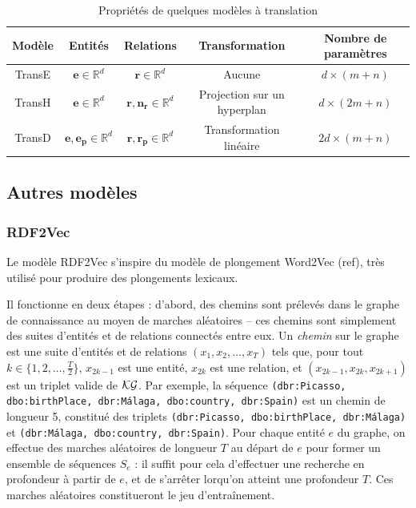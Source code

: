 \begin{table}[ht]
\caption{Propriétés de quelques modèles à translation}
\centering
\begin{tabular}{|c|c|c|c|c|}
\hline\rowcolor[gray]{0.8}\color{black}
Modèle & Entités & Relations & Transformation & Nombre de paramètres\\\hline
TransE & $\mathbf{e} \in \mathbb{R}^d$ & $\mathbf{r} \in \mathbb{R}^d$ & Aucune & $d \times (m + n)$ \\
TransH & $\mathbf{e} \in \mathbb{R}^d$ & $\mathbf{r, n_r} \in \mathbb{R}^d$ & Projection sur un hyperplan & $d \times (2m + n)$ \\
TransD & $\mathbf{e, e_p} \in \mathbb{R}^d$ & $\mathbf{r, r_p} \in \mathbb{R}^d$  & Transformation linéaire & $2d \times (m + n)$ \\\hline
\end{tabular}
\label{tab:transx}
\end{table}

\subsection{Autres modèles}
\label{subsec:kge-models-misc}

\subsubsection{RDF2Vec}

Le modèle RDF2Vec s'inspire du modèle de plongement Word2Vec (ref), très utilisé pour produire des plongements lexicaux.

Il fonctionne en deux étapes : d'abord, des chemins sont prélevés dans le graphe de connaissance au moyen de marches aléatoires – ces chemins sont simplement des suites d'entités et de relations connectés entre eux. %
Un \textit{chemin} sur le graphe est une suite d'entités et de relations $(x_1, x_2, \ldots, x_T)$ tels que, pour tout $k \in \{1, 2, \ldots, \frac{T}{2}\}$, $x_{2k-1}$ est une entité, $x_{2k}$ est une relation, et $(x_{2k-1}, x_{2k}, x_{2k+1})$ est un triplet valide de $\mathcal{KG}$. Par exemple, la séquence \texttt{(dbr:Picasso, dbo:birthPlace, dbr:Málaga, dbo:country, dbr:Spain)} est un chemin de longueur 5, constitué des triplets \texttt{(dbr:Picasso, dbo:birthPlace, dbr:Málaga)} et \texttt{(dbr:Málaga, dbo:country, dbr:Spain)}.
Pour chaque entité $e$ du graphe, on effectue des marches aléatoires de longueur $T$ au départ de $e$ pour former un ensemble de séquences $S_e$ : il suffit pour cela d'effectuer une recherche en profondeur à partir de $e$, et de s'arrêter lorqu'on atteint une profondeur $T$. Ces marches aléatoires constitueront le jeu d'entraînement.

